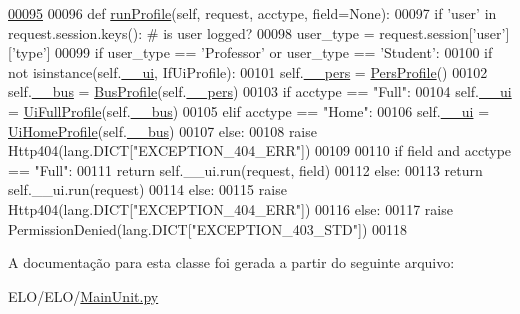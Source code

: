 \begin{DoxyCode}
\hypertarget{classELO_1_1MainUnit_1_1Factory_l00095}{}\hyperlink{classELO_1_1MainUnit_1_1Factory_ab20a76f74180fc77c6b8fcd8de7942f1}{00095} 
00096     \textcolor{keyword}{def }\hyperlink{classELO_1_1MainUnit_1_1Factory_ab20a76f74180fc77c6b8fcd8de7942f1}{runProfile}(self, request, acctype, field=None):
00097         \textcolor{keywordflow}{if} \textcolor{stringliteral}{'user'} \textcolor{keywordflow}{in} request.session.keys(): \textcolor{comment}{# is user logged?}
00098             user\_type = request.session[\textcolor{stringliteral}{'user'}][\textcolor{stringliteral}{'type'}]
00099             \textcolor{keywordflow}{if} user\_type == \textcolor{stringliteral}{'Professor'} \textcolor{keywordflow}{or} user\_type == \textcolor{stringliteral}{'Student'}:
00100                 \textcolor{keywordflow}{if} \textcolor{keywordflow}{not} isinstance(self.\hyperlink{classELO_1_1MainUnit_1_1Factory_a189a44a11e1a66ba69663eb2c598dd7c}{\_\_ui}, IfUiProfile):
00101                     self.\hyperlink{classELO_1_1MainUnit_1_1Factory_a68f6640ad3b515e1b8cd48d1554c0779}{\_\_pers} = \hyperlink{classProfile_1_1ProfileUnit_1_1PersProfile}{PersProfile}()
00102                     self.\hyperlink{classELO_1_1MainUnit_1_1Factory_a6a0b7b93046e095779ba54e0a8a4d02c}{\_\_bus} = \hyperlink{classProfile_1_1ProfileUnit_1_1BusProfile}{BusProfile}(self.\hyperlink{classELO_1_1MainUnit_1_1Factory_a68f6640ad3b515e1b8cd48d1554c0779}{\_\_pers})
00103                 \textcolor{keywordflow}{if} acctype == \textcolor{stringliteral}{"Full"}:
00104                     self.\hyperlink{classELO_1_1MainUnit_1_1Factory_a189a44a11e1a66ba69663eb2c598dd7c}{\_\_ui} = \hyperlink{classProfile_1_1ProfileUnit_1_1UiFullProfile}{UiFullProfile}(self.\hyperlink{classELO_1_1MainUnit_1_1Factory_a6a0b7b93046e095779ba54e0a8a4d02c}{\_\_bus})
00105                 \textcolor{keywordflow}{elif} acctype == \textcolor{stringliteral}{"Home"}:
00106                     self.\hyperlink{classELO_1_1MainUnit_1_1Factory_a189a44a11e1a66ba69663eb2c598dd7c}{\_\_ui} = \hyperlink{classProfile_1_1ProfileUnit_1_1UiHomeProfile}{UiHomeProfile}(self.\hyperlink{classELO_1_1MainUnit_1_1Factory_a6a0b7b93046e095779ba54e0a8a4d02c}{\_\_bus})
00107                 \textcolor{keywordflow}{else}:
00108                     \textcolor{keywordflow}{raise} Http404(lang.DICT[\textcolor{stringliteral}{"EXCEPTION\_404\_ERR"}])
00109             
00110                 \textcolor{keywordflow}{if} field \textcolor{keywordflow}{and} acctype == \textcolor{stringliteral}{"Full"}:
00111                     \textcolor{keywordflow}{return} self.\_\_ui.run(request, field)
00112                 \textcolor{keywordflow}{else}:
00113                     \textcolor{keywordflow}{return} self.\_\_ui.run(request)
00114             \textcolor{keywordflow}{else}:
00115                 \textcolor{keywordflow}{raise} Http404(lang.DICT[\textcolor{stringliteral}{"EXCEPTION\_404\_ERR"}])
00116         \textcolor{keywordflow}{else}:
00117             \textcolor{keywordflow}{raise} PermissionDenied(lang.DICT[\textcolor{stringliteral}{"EXCEPTION\_403\_STD"}])
00118         

\end{DoxyCode}


A documentação para esta classe foi gerada a partir do seguinte arquivo\-:\begin{DoxyCompactItemize}
\item 
E\-L\-O/\-E\-L\-O/\hyperlink{MainUnit_8py}{Main\-Unit.\-py}\end{DoxyCompactItemize}
